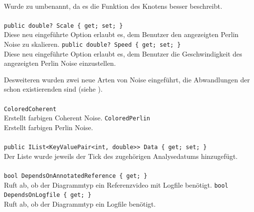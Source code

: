 \paragraph{}
\begin{itemize}
	\change Wurde zu   umbenannt, da es die Funktion des Knotens besser beschreibt.
\end{itemize}

\paragraph{}
\begin{itemize}
	\add \verb!public double? Scale { get; set; }! \\
	Diese neu eingeführte Option erlaubt es, dem Benutzer den angezeigten Perlin Noise zu skalieren.
	\add \verb!public double? Speed { get; set; }! \\
	Diese neu eingeführte Option erlaubt es, dem Benutzer die Geschwindigkeit des angezeigten Perlin Noise einzustellen.
\end{itemize}

Desweiteren wurden zwei neue Arten von Noise eingeführt, die Abwandlungen der schon existierenden sind (siehe ).

\paragraph{}
\begin{itemize}
	\add \verb!ColoredCoherent! \\
	Erstellt farbigen Coherent Noise.
	\add \verb!ColoredPerlin! \\
	Erstellt farbigen Perlin Noise.
\end{itemize}

\paragraph{}
\begin{itemize}
	\change \verb!public IList<KeyValuePair<int, double>> Data { get; set; }! \\
	Der Liste wurde jeweils der Tick des zugehörigen Analysedatums hinzugefügt.
\end{itemize}

\paragraph{}
\begin{itemize}
	\add \verb!bool DependsOnAnnotatedReference { get; }! \\
	Ruft ab, ob der Diagrammtyp ein Referenzvideo mit Logfile benötigt.
	\add \verb!bool DependsOnLogfile { get; }! \\
	Ruft ab, ob der Diagrammtyp ein Logfile benötigt.
\end{itemize}

